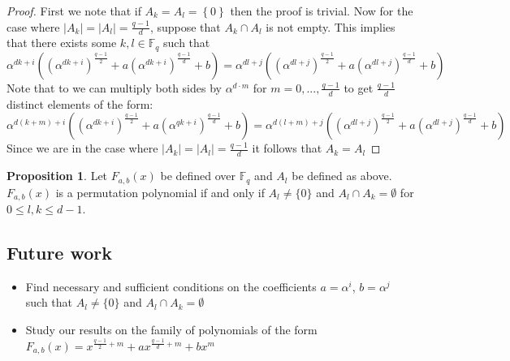 \documentclass{article}
\theoremstyle{definition}
\newtheorem{prop}[theorem]{Proposition}
\theoremstyle{remark}
\numberwithin{equation}{section}
\begin{document}
    \begin{proof}
      First we note that if $A_k = A_l = \left\{ 0 \right\}$ then the proof is trivial. Now for the case where $\left\vert A_k \right\vert = \left\vert A_l \right\vert = \frac{q-1}{d}$, suppose that $ A_k \cap A_l$ is not empty. This implies that there exists some $k,l \in \mathbb{F}_{q}$ such that 
      $$\alpha^{dk+i}((\alpha^{dk+i})^{\frac{q-1}{2}}+a(\alpha^{dk+i})^{\frac{q-1}{d}}+b) = \alpha^{dl+j}((\alpha^{dl+j})^{\frac{q-1}{2}}+a(\alpha^{dl+j})^{\frac{q-1}{d}}+b)$$
      Note that to we can multiply both sides by $\alpha^{d\cdot m}$ for $m=0,...,\frac{q-1}{d}$ to get $\frac{q-1}{d}$ distinct elements of the form:
      $$\alpha^{d(k+m)+i}((\alpha^{dk+i})^{\frac{q-1}{2}}+a(\alpha^{qk+i})^{\frac{q-1}{d}}+b) = \alpha^{d(l+m)+j}((\alpha^{dl+j})^{\frac{q-1}{2}}+a(\alpha^{dl+j})^{\frac{q-1}{d}}+b)$$
      Since we are in the case where  $\left\vert A_k \right\vert = \left\vert A_l \right\vert = \frac{q-1}{d}$ it follows that $A_k = A_l$
    \end{proof}

    \begin{prop}
      Let $F_{a,b}(x)$ be defined over $\mathbb{F}_{q}$ and $A_l$ be defined as above. $F_{a,b}(x)$ is a permutation polynomial if and only if $A_l \neq \{0\}$ and $A_l \cap A_k = \emptyset$ for $ 0 \leq l,k \leq d-1$. 
    \end{prop}
    
\subsection{Future work}    

    \begin{itemize}
      \item Find necessary and sufficient conditions on the coefficients $a=\alpha^i$, $b=\alpha^j$ such that $A_l \neq \{0\}$ and $A_l \cap A_k = \emptyset$
      \item Study our results on the family of polynomials of the form $F_{a,b}(x) = x^{\frac{q-1}{2}+m} + a x^{\frac{q-1}{d}+m} + b x^{m}$
    \end{itemize}
 
  
\end{document}
